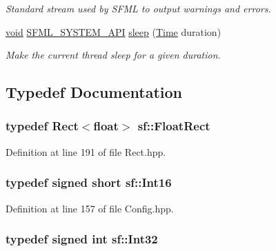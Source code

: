 \begin{DoxyCompactItemize}
\begin{DoxyCompactList}\small\item\em Standard stream used by S\-F\-M\-L to output warnings and errors. \end{DoxyCompactList}\item 
\hyperlink{glutf90_8h_ac778d6f63f1aaf8ebda0ce6ac821b56e}{void} \hyperlink{_system_2_export_8hpp_a6476c9e422606477a4c23d92b1d79a1f}{S\-F\-M\-L\-\_\-\-S\-Y\-S\-T\-E\-M\-\_\-\-A\-P\-I} \hyperlink{group__system_ga2f2620831533dee0ed432ed982342e09}{sleep} (\hyperlink{classsf_1_1_time}{Time} duration)
\begin{DoxyCompactList}\small\item\em Make the current thread sleep for a given duration. \end{DoxyCompactList}\end{DoxyCompactItemize}


\subsection{Typedef Documentation}
\hypertarget{namespacesf_aed4e58f586b2eed2621c0365d0b7554e}{
\subsubsection[{Float\-Rect}]{\setlength{\rightskip}{0pt plus 5cm}typedef {\bf Rect}$<$float$>$ {\bf sf\-::\-Float\-Rect}}}\label{namespacesf_aed4e58f586b2eed2621c0365d0b7554e}


Definition at line 191 of file Rect.\-hpp.

\hypertarget{namespacesf_a3c8e10435e2a310a7741755e66b5c94e}{
\subsubsection[{Int16}]{\setlength{\rightskip}{0pt plus 5cm}typedef signed short {\bf sf\-::\-Int16}}}\label{namespacesf_a3c8e10435e2a310a7741755e66b5c94e}


Definition at line 157 of file Config.\-hpp.

\hypertarget{namespacesf_ac2dfd4952377a26dee4750e2e4a30a15}{
\subsubsection[{Int32}]{\setlength{\rightskip}{0pt plus 5cm}typedef signed int {\bf sf\-::\-Int32}}}\label{namespacesf_ac2dfd4952377a26dee4750e2e4a30a15}


